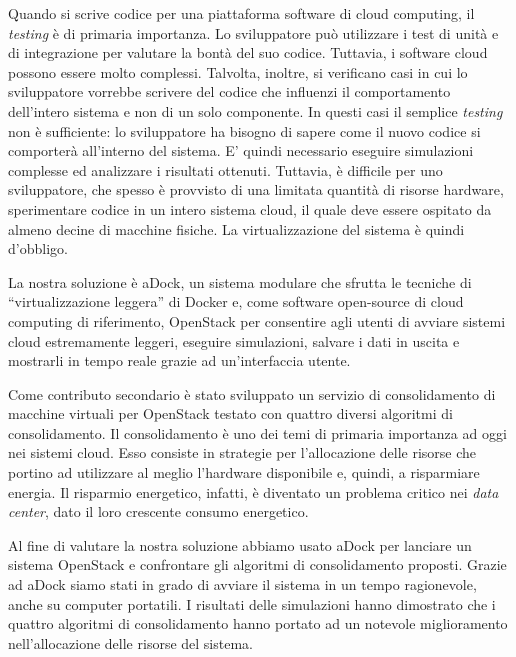 \begin{spacing}{1.1}
Quando si scrive codice per una piattaforma software di cloud computing, il \emph{testing} è di primaria importanza. Lo sviluppatore può utilizzare i test di unità e di integrazione per valutare la bontà del suo codice. Tuttavia, i software cloud possono essere molto complessi. Talvolta, inoltre, si verificano casi in cui lo sviluppatore vorrebbe scrivere del codice che influenzi il comportamento dell'intero sistema e non di un solo componente. In questi casi il semplice \emph{testing} non è sufficiente: lo sviluppatore ha bisogno di sapere come il nuovo codice si comporterà all'interno del sistema. E' quindi necessario eseguire simulazioni complesse ed analizzare i risultati ottenuti. Tuttavia, è difficile per uno sviluppatore, che spesso è provvisto di una limitata quantità di risorse hardware, sperimentare codice in un intero sistema cloud, il quale deve essere ospitato da almeno decine di macchine fisiche. La virtualizzazione del sistema è quindi d'obbligo.

La nostra soluzione è aDock, un sistema modulare che sfrutta le tecniche di ``virtualizzazione leggera'' di Docker e, come software open-source di cloud computing di riferimento, OpenStack per consentire agli utenti di avviare sistemi cloud estremamente leggeri, eseguire simulazioni, salvare i dati in uscita e mostrarli in tempo reale grazie ad un'interfaccia utente.

Come contributo secondario è stato sviluppato un servizio di consolidamento di macchine virtuali per OpenStack testato con quattro diversi algoritmi di consolidamento. Il consolidamento è uno dei temi di primaria importanza ad oggi nei sistemi cloud. Esso consiste in strategie per l'allocazione delle risorse che portino ad utilizzare al meglio l'hardware disponibile e, quindi, a risparmiare energia. Il risparmio energetico, infatti, è diventato un problema critico nei \emph{data center}, dato il loro crescente consumo energetico.

Al fine di valutare la nostra soluzione abbiamo usato aDock per lanciare un sistema OpenStack e confrontare gli algoritmi di consolidamento proposti. Grazie ad aDock siamo stati in grado di avviare il sistema in un tempo ragionevole, anche su computer portatili. I risultati delle simulazioni hanno dimostrato che i quattro algoritmi di consolidamento hanno portato ad un notevole miglioramento nell'allocazione delle risorse del sistema.
\end{spacing}